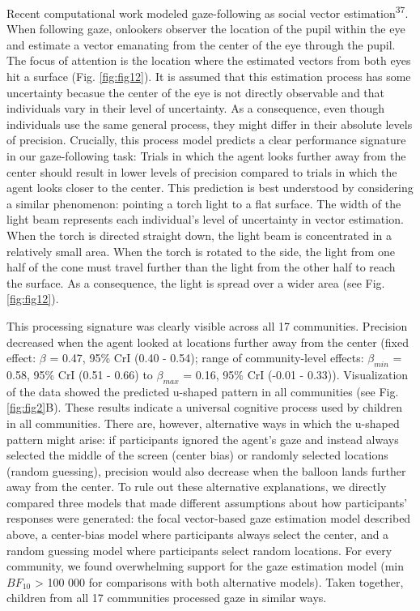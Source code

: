 \documentclass[
  man,floatsintext]{apa6}
\begin{document}
Recent computational work modeled gaze-following as social vector estimation\textsuperscript{37}. When following gaze, onlookers observer the location of the pupil within the eye and estimate a vector emanating from the center of the eye through the pupil. The focus of attention is the location where the estimated vectors from both eyes hit a surface (Fig. \ref{fig:fig12}). It is assumed that this estimation process has some uncertainty becasue the center of the eye is not directly observable and that individuals vary in their level of uncertainty. As a consequence, even though individuals use the same general process, they might differ in their absolute levels of precision. Crucially, this process model predicts a clear performance signature in our gaze-following task: Trials in which the agent looks further away from the center should result in lower levels of precision compared to trials in which the agent looks closer to the center. This prediction is best understood by considering a similar phenomenon: pointing a torch light to a flat surface. The width of the light beam represents each individual's level of uncertainty in vector estimation. When the torch is directed straight down, the light beam is concentrated in a relatively small area. When the torch is rotated to the side, the light from one half of the cone must travel further than the light from the other half to reach the surface. As a consequence, the light is spread over a wider area (see Fig. \ref{fig:fig12}).

This processing signature was clearly visible across all 17 communities. Precision decreased when the agent looked at locations further away from the center (fixed effect: \(\beta\) = 0.47, 95\% CrI (0.40 - 0.54); range of community-level effects: \(\beta_{min}\) = 0.58, 95\% CrI (0.51 - 0.66) to \(\beta_{max}\) = 0.16, 95\% CrI (-0.01 - 0.33)). Visualization of the data showed the predicted u-shaped pattern in all communities (see Fig. \ref{fig:fig2}B). These results indicate a universal cognitive process used by children in all communities. There are, however, alternative ways in which the u-shaped pattern might arise: if participants ignored the agent's gaze and instead always selected the middle of the screen (center bias) or randomly selected locations (random guessing), precision would also decrease when the balloon lands further away from the center. To rule out these alternative explanations, we directly compared three models that made different assumptions about how participants' responses were generated: the focal vector-based gaze estimation model described above, a center-bias model where participants always select the center, and a random guessing model where participants select random locations. For every community, we found overwhelming support for the gaze estimation model (min \(BF_{10}\) \textgreater{} 100 000 for comparisons with both alternative models). Taken together, children from all 17 communities processed gaze in similar ways.
\end{document}
